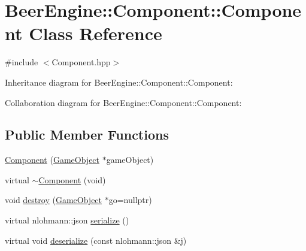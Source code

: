 \hypertarget{class_beer_engine_1_1_component_1_1_component}{}\section{Beer\+Engine\+:\+:Component\+:\+:Component Class Reference}
\label{class_beer_engine_1_1_component_1_1_component}


{\ttfamily \#include $<$Component.\+hpp$>$}



Inheritance diagram for Beer\+Engine\+:\+:Component\+:\+:Component\+:


Collaboration diagram for Beer\+Engine\+:\+:Component\+:\+:Component\+:
\subsection*{Public Member Functions}
\begin{DoxyCompactItemize}
\item 
\mbox{\hyperlink{class_beer_engine_1_1_component_1_1_component_ac8c3bb83023f324a8dbf63980a08a5cc}{Component}} (\mbox{\hyperlink{class_beer_engine_1_1_game_object}{Game\+Object}} $\ast$game\+Object)
\item 
virtual \mbox{\hyperlink{class_beer_engine_1_1_component_1_1_component_a1688651a7403f4ff4587185df0b1e8ed}{$\sim$\+Component}} (void)
\item 
void \mbox{\hyperlink{class_beer_engine_1_1_component_1_1_component_a185d4b4ebe7135ce55222b94e3fdd8bf}{destroy}} (\mbox{\hyperlink{class_beer_engine_1_1_game_object}{Game\+Object}} $\ast$go=nullptr)
\item 
virtual nlohmann\+::json \mbox{\hyperlink{class_beer_engine_1_1_component_1_1_component_a4d82d8a6b22b93514e0585fa4073041f}{serialize}} ()
\item 
virtual void \mbox{\hyperlink{class_beer_engine_1_1_component_1_1_component_a044d30f65879a1467f44aa3eb8ad7bce}{deserialize}} (const nlohmann\+::json \&j)
\end{DoxyCompactItemize}

